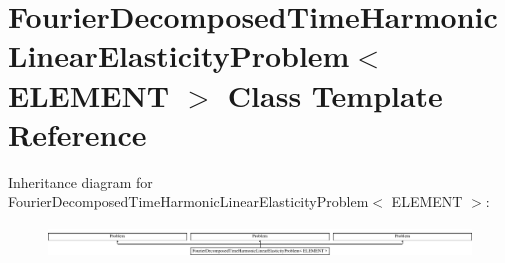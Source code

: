\hypertarget{classFourierDecomposedTimeHarmonicLinearElasticityProblem}{}\section{Fourier\+Decomposed\+Time\+Harmonic\+Linear\+Elasticity\+Problem$<$ E\+L\+E\+M\+E\+NT $>$ Class Template Reference}
\label{classFourierDecomposedTimeHarmonicLinearElasticityProblem}
Inheritance diagram for Fourier\+Decomposed\+Time\+Harmonic\+Linear\+Elasticity\+Problem$<$ E\+L\+E\+M\+E\+NT $>$\+:\begin{figure}[H]
\begin{center}
\leavevmode
\includegraphics[height=0.870241cm]{classFourierDecomposedTimeHarmonicLinearElasticityProblem}
\end{center}
\end{figure}

